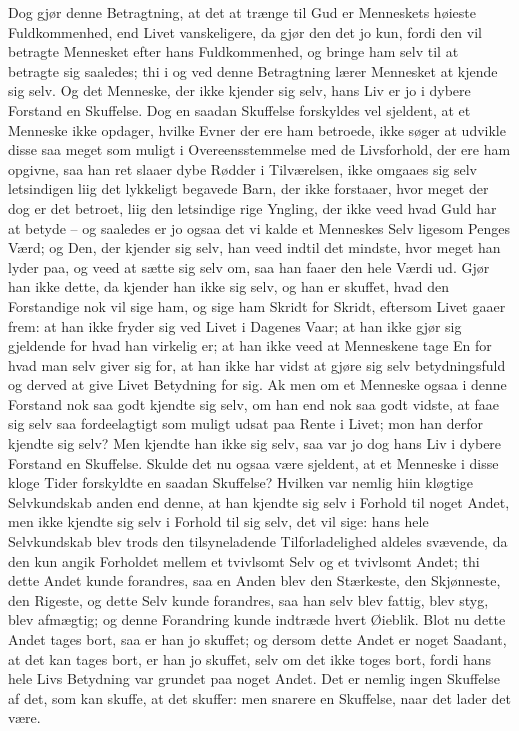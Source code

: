\documentclass[12pt,a4paper]{article}
\begin{document}
Dog gjør denne Betragtning, at det at trænge til Gud er Menneskets høieste Fuldkommenhed, end Livet vanskeligere, da gjør den det jo kun, fordi den vil betragte Mennesket efter hans Fuldkommenhed, og bringe ham selv til at betragte sig saaledes; thi i og ved denne Betragtning lærer Mennesket at kjende sig selv. Og det Menneske, der ikke kjender sig selv, hans Liv er jo i dybere Forstand en Skuffelse. Dog en saadan Skuffelse forskyldes vel sjeldent, at et Menneske ikke opdager, hvilke Evner der ere ham betroede, ikke søger at udvikle disse saa meget som muligt i Overeensstemmelse med de Livsforhold, der ere ham opgivne, saa han ret slaaer dybe Rødder i Tilværelsen, ikke omgaaes sig selv letsindigen liig det lykkeligt begavede Barn, der ikke forstaaer, hvor meget der dog er det betroet, liig den letsindige rige Yngling, der ikke veed hvad Guld har at betyde – og saaledes er jo ogsaa det vi kalde et Menneskes Selv ligesom Penges Værd; og Den, der kjender sig selv, han veed indtil det mindste, hvor meget han lyder paa, og veed at sætte sig selv om, saa han faaer den hele Værdi ud. Gjør han ikke dette, da kjender han ikke sig selv, og han er skuffet, hvad den Forstandige nok vil sige ham, og sige ham Skridt for Skridt, eftersom Livet gaaer frem: at han ikke fryder sig ved Livet i Dagenes Vaar; at han ikke gjør sig gjeldende for hvad han virkelig er; at han ikke veed at Menneskene tage En for hvad man selv giver sig for, at han ikke har vidst at gjøre sig selv betydningsfuld og derved at give Livet Betydning for sig. Ak men om et Menneske ogsaa i denne Forstand nok saa godt kjendte sig selv, om han end nok saa godt vidste, at faae sig selv saa fordeelagtigt som muligt udsat paa Rente i Livet; mon han derfor kjendte sig selv? Men kjendte han ikke sig selv, saa var jo dog hans Liv i dybere Forstand en Skuffelse. Skulde det nu ogsaa være sjeldent, at et Menneske i disse kloge Tider forskyldte en saadan Skuffelse? Hvilken var nemlig hiin kløgtige Selvkundskab anden end denne, at han kjendte sig selv i Forhold til noget Andet, men ikke kjendte sig selv i Forhold til sig selv, det vil sige: hans hele Selvkundskab blev trods den tilsyneladende Tilforladelighed aldeles svævende, da den kun angik Forholdet mellem et tvivlsomt Selv og et tvivlsomt Andet; thi dette Andet kunde forandres, saa en Anden blev den Stærkeste, den Skjønneste, den Rigeste, og dette Selv kunde forandres, saa han selv blev fattig, blev styg, blev afmægtig; og denne Forandring kunde indtræde hvert Øieblik. Blot nu dette Andet tages bort, saa er han jo skuffet; og dersom dette Andet er noget Saadant, at det kan tages bort, er han jo skuffet, selv om det ikke toges bort, fordi hans hele Livs Betydning var grundet paa noget Andet. Det er nemlig ingen Skuffelse af det, som kan skuffe, at det skuffer: men snarere en Skuffelse, naar det lader det være.
\end{document}

